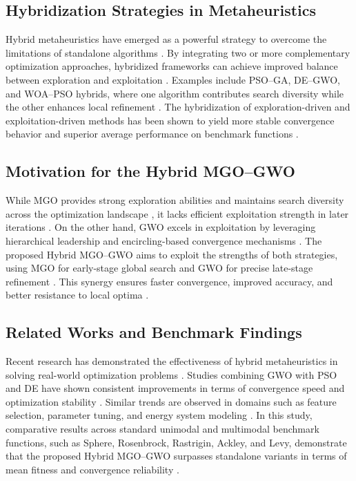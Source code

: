 \documentclass[12pt,a4paper]{article}
\begin{document}
\subsection{Hybridization Strategies in Metaheuristics}
Hybrid metaheuristics have emerged as a powerful strategy to overcome the limitations of standalone algorithms \cite{hybrid_review}. By integrating two or more complementary optimization approaches, hybridized frameworks can achieve improved balance between exploration and exploitation \cite{alsorori2020, abualigah2021aqp}. Examples include PSO–GA, DE–GWO, and WOA–PSO hybrids, where one algorithm contributes search diversity while the other enhances local refinement \cite{zamani2021}. The hybridization of exploration-driven and exploitation-driven methods has been shown to yield more stable convergence behavior and superior average performance on benchmark functions \cite{abualigah2021aoa, elaziz2021}.

\subsection{Motivation for the Hybrid MGO–GWO}
While MGO provides strong exploration abilities and maintains search diversity across the optimization landscape \cite{mgo}, it lacks efficient exploitation strength in later iterations \cite{benchmark}. On the other hand, GWO excels in exploitation by leveraging hierarchical leadership and encircling-based convergence mechanisms \cite{gwo}. The proposed Hybrid MGO–GWO aims to exploit the strengths of both strategies, using MGO for early-stage global search and GWO for precise late-stage refinement \cite{mirjalili2016woa}. This synergy ensures faster convergence, improved accuracy, and better resistance to local optima \cite{alsorori2020, elaziz2021}.

\subsection{Related Works and Benchmark Findings}
Recent research has demonstrated the effectiveness of hybrid metaheuristics in solving real-world optimization problems \cite{hybrid_review}. Studies combining GWO with PSO and DE have shown consistent improvements in terms of convergence speed and optimization stability \cite{zamani2021, shayanfar2018}. Similar trends are observed in domains such as feature selection, parameter tuning, and energy system modeling \cite{abdollahzadeh2021a}. In this study, comparative results across standard unimodal and multimodal benchmark functions, such as Sphere, Rosenbrock, Rastrigin, Ackley, and Levy, demonstrate that the proposed Hybrid MGO–GWO surpasses standalone variants in terms of mean fitness and convergence reliability \cite{gharehchopogh2021, abdollahzadeh2021avoa}.
\end{document}
